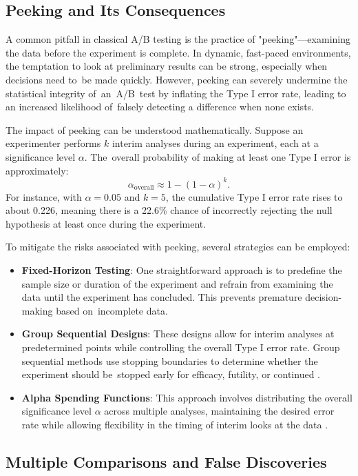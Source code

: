 \documentclass[magisterska, english]{pwr_wmat_praca_dyplomowa}
\theoremstyle{plain}
\numberwithin{theorem}{chapter}
\theoremstyle{definition}
\numberwithin{theorem}{chapter}
\begin{document}
\subsection{Peeking and Its Consequences}

A common pitfall in classical A/B testing is the practice of "peeking"—examining the data before the experiment is complete. In dynamic, fast-paced environments, the temptation to look at preliminary results can be strong, especially when decisions need to~be made quickly. However, peeking can severely undermine the statistical integrity of~an~A/B~test by inflating the Type I error rate, leading to an increased likelihood of~falsely detecting a difference when none exists.

The impact of peeking can be understood mathematically. Suppose an experimenter performs \( k \) interim analyses during an experiment, each at a significance level \( \alpha \). The~overall probability of making at least one Type I error is approximately:
\[
\alpha_{\text{overall}} \approx 1 - (1 - \alpha)^k.
\]
For instance, with \( \alpha = 0.05 \) and \( k = 5 \), the cumulative Type I error rate rises to about 0.226, meaning there is a 22.6\% chance of incorrectly rejecting the null hypothesis at least once during the experiment.

To mitigate the risks associated with peeking, several strategies can be employed:
\begin{itemize}
	\item \textbf{Fixed-Horizon Testing}: One straightforward approach is to predefine the sample size or duration of the experiment and refrain from examining the data until the experiment has concluded. This prevents premature decision-making based on~incomplete data.
	\item \textbf{Group Sequential Designs}: These designs allow for interim analyses at predetermined points while controlling the overall Type I error rate. Group sequential methods use stopping boundaries to determine whether the experiment should be~stopped early for efficacy, futility, or continued \cite{Pocock1977}.
	\item \textbf{Alpha Spending Functions}: This approach involves distributing the overall significance level \( \alpha \) across multiple analyses, maintaining the desired error rate while allowing flexibility in the timing of interim looks at the data \cite{DeMets1994}.
\end{itemize}

\subsection{Multiple Comparisons and False Discoveries}
\end{document}
